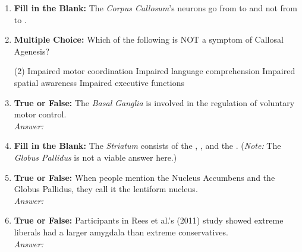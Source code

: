 \begin{enumerate}[label=\textbf{Q1.10.\arabic*}]
      \item \textbf{Fill in the Blank:} The \textit{Corpus Callosum}'s neurons go from \underline{\hspace{3cm}} to \underline{\hspace{3cm}} and not from \underline{\hspace{3cm}} to \underline{\hspace{3cm}}. \\

      \item \textbf{Multiple Choice:} Which of the following is NOT a symptom of Callosal Agenesis?
            \begin{tasks}[label=(\Alph*), label-width=1.5em, item-indent=1.7em](2) %
                  \task Impaired motor coordination
                  \task Impaired language comprehension
                  \task Impaired spatial awareness
                  \task Impaired executive functions
            \end{tasks}

      \item \textbf{True or False:} The \textit{Basal Ganglia} is involved in the regulation of voluntary motor control. \\
            \textit{Answer:} %

      \item \textbf{Fill in the Blank:} The \textit{Striatum} consists of the \underline{\hspace{3cm}}, \underline{\hspace{3cm}}, and the \underline{\hspace{3cm}}. (\textit{Note:} The \textit{Globus Pallidus} is not a viable answer here.) \\

      \item \textbf{True or False:} When people mention the Nucleus Accumbens and the Globus Pallidus, they call it the lentiform nucleus. \\
            \textit{Answer:} %

      \item \textbf{True or False:} Participants in Rees et al.'s (2011) study showed extreme liberals had a larger amygdala than extreme conservatives. \\
            \textit{Answer:} %


\end{enumerate}
